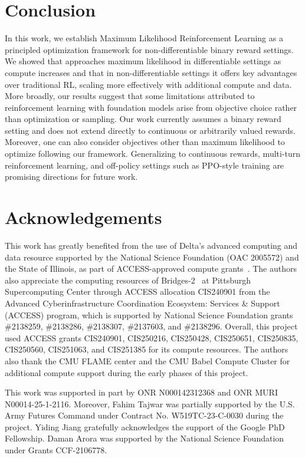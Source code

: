 \documentclass[10pt]{article} %
\begin{document}
\section{Conclusion}

In this work, we establish Maximum Likelihood Reinforcement Learning as a principled optimization framework for non-differentiable binary reward settings. We showed that \ours{} approaches maximum likelihood in differentiable settings as compute increases and that in non-differentiable settings it offers key advantages over traditional RL, scaling more effectively with additional compute and data. More broadly, our results suggest that some limitations attributed to reinforcement learning with foundation models arise from objective choice rather than optimization or sampling. Our work currently assumes a binary reward setting and does not extend directly to continuous or arbitrarily valued rewards. Moreover, one can also consider objectives other than maximum likelihood to optimize following our framework. Generalizing \ours{} to continuous rewards, multi-turn reinforcement learning, and off-policy settings such as PPO-style training are promising directions for future work.


\section*{Acknowledgements}

This work has greatly benefited from the use of Delta's advanced computing and data resource supported by the National Science Foundation (OAC 2005572) and the State of Illinois, as part of ACCESS-approved compute grants~\citep{access_compute}. The authors also appreciate the computing resources of Bridges-2~\citep{psc_computing} at Pittsburgh Supercomputing Center through ACCESS allocation CIS240901 from the Advanced Cyberinfrastructure Coordination Ecosystem: Services \& Support (ACCESS) program, which is supported by National Science Foundation grants \#2138259, \#2138286, \#2138307, \#2137603, and \#2138296. Overall, this project used ACCESS grants  CIS240901, CIS250216, CIS250428, CIS250651, CIS250835, CIS250560, CIS251063, and CIS251385 for its compute resources. The authors also thank the CMU FLAME center and the CMU Babel Compute Cluster for additional compute support during the early phases of this project. 

This work was supported in part by ONR N000142312368 and ONR MURI N00014-25-1-2116. Moreover, Fahim Tajwar was partially supported by the U.S. Army Futures Command under Contract No. W519TC-23-C-0030 during the project. Yiding Jiang gratefully acknowledges the support of the Google PhD Fellowship. Daman Arora was supported by the National Science Foundation under Grants CCF-2106778.
\end{document}
